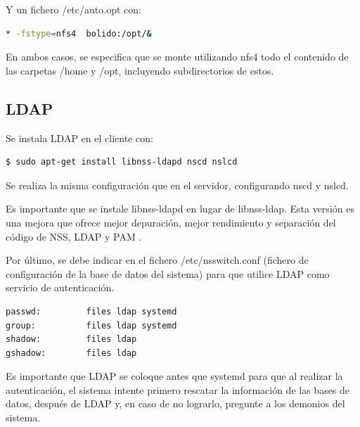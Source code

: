 Y un fichero /etc/auto.opt con:

\vspace{2mm}
\begin{lstlisting}[language=bash]
    * -fstype=nfs4  bolido:/opt/&
\end{lstlisting}
\vspace{2mm}

En ambos casos, se especifica que se monte utilizando nfs4 todo el contenido de las carpetas /home y /opt, incluyendo subdirectorios de estos.


\subsection{LDAP}

Se instala LDAP en el cliente \cite{ldapconfiguration} con:
\vspace{2mm}

\begin{lstlisting}[language=bash]
    $ sudo apt-get install libnss-ldapd nscd nslcd
\end{lstlisting}
\vspace{2mm}

Se realiza la misma configuración que en el servidor, configurando nscd y nslcd. 

\vspace{2mm}
\vspace{4mm}

Es importante que se instale libnss-ldapd en lugar de libnss-ldap. Esta versión es una mejora que ofrece mejor depuración, mejor rendimiento y separación del código de NSS, LDAP y PAM \cite{libnsspamd}. 

\vspace{4mm}
Por último, se debe indicar en el fichero /etc/nsswitch.conf \cite{nsswitchconf} (fichero de configuración de la base de datos del sistema) para que utilice LDAP como servicio de autenticación.

\vspace{4mm}
\begin{lstlisting}[language=bash,caption={Fichero /etc/nsswitch.conf},xleftmargin=.25\textwidth]
passwd:         files ldap systemd 
group:          files ldap systemd
shadow:         files ldap
gshadow:        files ldap
\end{lstlisting}
\vspace{2mm}

Es importante que LDAP se coloque antes que systemd para que al realizar la autenticación, el sistema intente primero rescatar la información de las bases de datos, después de LDAP y, en caso de no lograrlo, pregunte a los demonios del sistema.

